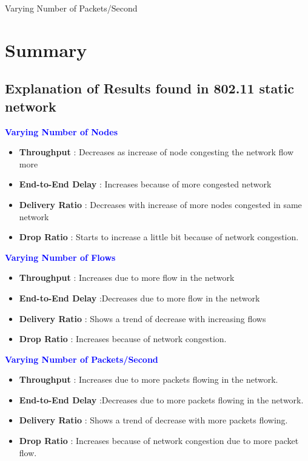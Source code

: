 \documentclass{article}[12pt]
\begin{document}





\vspace*{\fill}
\begin{center}
	\Large{Varying Number of Packets/Second}
\end{center}
\vspace*{\fill}







\section{Summary}

\subsection{Explanation of Results found in 802.11 static network}

	\textbf{\textcolor{blue}{Varying Number of Nodes}}
  \begin{itemize}
  	\item \textbf{Throughput} : Decreases as increase of node congesting the network flow more
  	\item \textbf{End-to-End Delay} : Increases because of more congested network
  	\item \textbf{Delivery Ratio} : Decreases with increase of more nodes congested in same network
  	\item \textbf{Drop Ratio} : Starts to increase a little bit because of network congestion.
  \end{itemize}


   \textbf{\textcolor{blue}{Varying Number of Flows}}
	\begin{itemize}
	\item \textbf{Throughput} : Increases due to more flow in the network
	\item \textbf{End-to-End Delay} :Decreases due to more flow in the network
	\item \textbf{Delivery Ratio} : Shows a trend of decrease with increasing flows
	\item \textbf{Drop Ratio} : Increases because of network congestion.
	\end{itemize}

 \textbf{\textcolor{blue}{Varying Number of Packets/Second}}
\begin{itemize}
	\item \textbf{Throughput} : Increases due to more packets flowing in the network.
	\item \textbf{End-to-End Delay} :Decreases due to more packets flowing in the network.
	\item \textbf{Delivery Ratio} : Shows a trend of decrease with more packets flowing. 
	\item \textbf{Drop Ratio} : Increases because of network congestion due to more packet flow.
\end{itemize}
\end{document}

